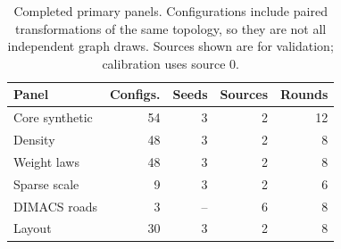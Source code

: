 \begin{table}[tb]\centering\small\setlength{\tabcolsep}{3.5pt}
\caption{Completed primary panels. Configurations include paired transformations of the same topology, so they are not all independent graph draws. Sources shown are for validation; calibration uses source 0.}
\begin{tabular}{lrrrr}
\toprule
Panel & Configs. & Seeds & Sources & Rounds \\ \midrule
Core synthetic & 54 & 3 & 2 & 12 \\
Density & 48 & 3 & 2 & 8 \\
Weight laws & 48 & 3 & 2 & 8 \\
Sparse scale & 9 & 3 & 2 & 6 \\
DIMACS roads & 3 & -- & 6 & 8 \\
Layout & 30 & 3 & 2 & 8 \\
\bottomrule\end{tabular}\end{table}
